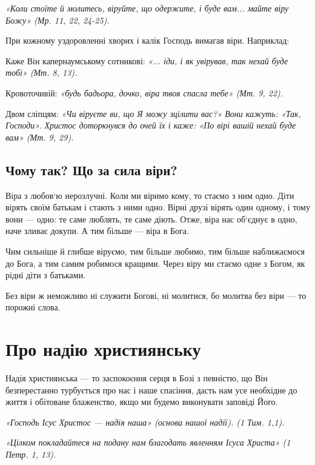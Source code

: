 \documentclass[main.tex]{subfiles}
\begin{document}
\begin{FlushRight}
    \emph{«Коли стоїте й молитесь, віруйте, що одержите, і буде вам... майте віру Божу» (Мр. 11, 22, 24-25).} 
\end{FlushRight}

При кожному уздоровленні хворих і калік Господь вимагав віри. Наприклад:

\noindent Каже Він капернаумському сотникові: {\color{red} \emph{«... іди, і як увірував, так нехай буде тобі» (Мт. 8, 13).}}

\noindent Кровоточивій: {\color{red} \emph{«будь бадьора, дочко, віра твоя спасла тебе» (Мт. 9, 22).}}

\noindent Двом сліпцям: \emph{{\color{red} «Чи віруєте ви, що Я можу зцілити вас?»} Вони кажуть: «Так, Господи». Христос доторкнувся до очей їх і каже: {\color{red} «По вірі вашій нехай буде вам»} (Мт. 9, 29).}

\subsection{Чому так? Що за сила віри?}
Віра з любов`ю нерозлучні. Коли ми віримо кому, то стаємо з ним одно. Діти вірять своїм батькам і стають з ними одно. Вірні друзі вірять один одному, і тому вони — одно: те саме люблять, те саме діють. Отже, віра нас об`єднує в одно, наче зливає докупи. А тим більше — віра в Бога.

Чим сильніше й глибше віруємо, тим більше любимо, тим більше наближаємося до Бога, а тим самим робимося кращими. Через віру ми стаємо одне з Богом, як рідні діти з батьками.

Без віри ж неможливо ні служити Богові, ні молитися, бо молитва без віри — то порожні слова.

\section{Про надію християнську}

Надія християнська — то заспокоєння серця в Бозі з певністю, що Він безперестанно турбується про нас і наше спасіння, дасть нам усе необхідне до життя і обітоване блаженство, якщо ми будемо виконувати заповіді Його.

\begin{FlushRight}
    \emph{«Господь Ісус Христос — надія наша» (основа нашої надії). (1 Тим. 1,1).}
\end{FlushRight}

\begin{FlushRight}
    \emph{«Цілком покладайтеся на подану нам благодать явленням Ісуса Христа» (1 Петр. 1, 13).}
\end{FlushRight}
\end{document}
